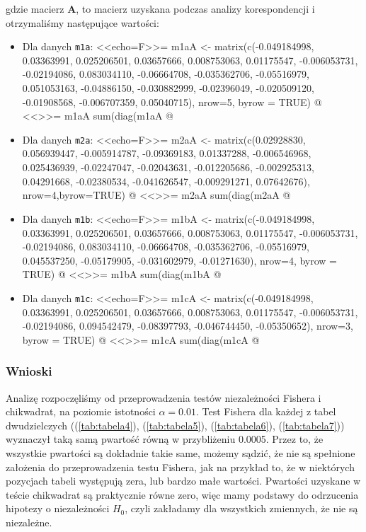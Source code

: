 \documentclass[12pt]{mwart}
\begin{document}
gdzie macierz $\mathbf{A}$, to macierz uzyskana podczas analizy korespondencji i otrzymaliśmy następujące wartości:
\begin{itemize}[label=$\bullet$]
	\item Dla danych \verb|m1a|:
	<<echo=F>>=
	  m1aA <- matrix(c(-0.049184998,  0.03363991,  0.025206501,  0.03657666,
	0.008753063,  0.01175547, -0.006053731, -0.02194086,
	0.083034110, -0.06664708, -0.035362706, -0.05516979,
	0.051053163, -0.04886150, -0.030882999, -0.02396049,
	-0.020509120, -0.01908568, -0.006707359,  0.05040715), 
	nrow=5, byrow = TRUE)
	@
	<<>>=
	m1aA
	sum(diag(m1aA %
	@
	\item Dla danych \verb|m2a|:
	<<echo=F>>=
	    m2aA <- matrix(c(0.02928830,  0.056939447, -0.005914787, -0.09369183,
	0.01337288, -0.006546968,  0.025436939, -0.02247047,
	-0.02043631, -0.012205686, -0.002925313,  0.04291668,
	-0.02380534, -0.041626547, -0.009291271,  0.07642676),
	nrow=4,byrow=TRUE)
	@
	<<>>=
	m2aA
	sum(diag(m2aA %
	@
	\item Dla danych \verb|m1b|:
	<<echo=F>>=
	m1bA <- matrix(c(-0.049184998,  0.03363991,  0.025206501,  0.03657666,
	0.008753063,  0.01175547, -0.006053731, -0.02194086,
	0.083034110, -0.06664708, -0.035362706, -0.05516979,
	0.045537250, -0.05179905, -0.031602979, -0.01271630), 
	nrow=4, byrow = TRUE)
	@
	<<>>=
	m1bA
	sum(diag(m1bA %
	@
	\item Dla danych \verb|m1c|:
	<<echo=F>>=
	m1cA <- matrix(c(-0.049184998,  0.03363991,  0.025206501,  0.03657666,
	0.008753063,  0.01175547, -0.006053731, -0.02194086,
	0.094542479, -0.08397793, -0.046744450, -0.05350652), 
	nrow=3, byrow = TRUE)
	@
	<<>>=
	m1cA
	sum(diag(m1cA %
	@
\end{itemize}
\subsubsection{Wnioski}
Analizę rozpoczęliśmy od przeprowadzenia testów niezależności Fishera i chi{\dywiz}kwadrat, na poziomie istotności $\alpha=0.01$. Test Fishera dla każdej z tabel dwudzielczych ((\ref{tab:tabela4}), (\ref{tab:tabela5}), (\ref{tab:tabela6}), (\ref{tab:tabela7})) wyznaczył taką samą p{\dywiz}wartość równą w przybliżeniu 0.0005. Przez to, że wszystkie p{\dywiz}wartości są dokładnie takie same, możemy sądzić, że nie są spełnione założenia do przeprowadzenia testu Fishera, jak na przykład to, że w niektórych pozycjach tabeli występują zera, lub bardzo małe wartości. P{\dywiz}wartości uzyskane w teście chi{\dywiz}kwadrat są praktycznie równe zero, więc mamy podstawy do odrzucenia hipotezy o niezależności $H_0$, czyli zakładamy dla wszystkich zmiennych, że nie są niezależne.
\end{document}

